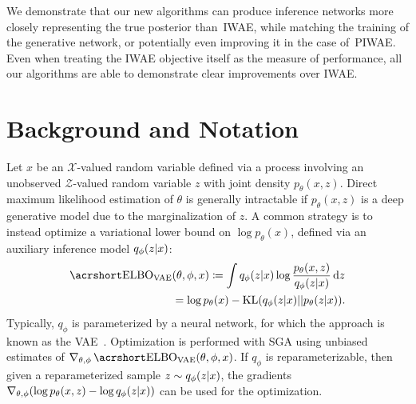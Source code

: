 We demonstrate that
our new algorithms can produce inference networks more closely representing the true posterior
than~\gls{IWAE}, while matching the
training of the generative network, or potentially even improving it in the case of~\gls{PIWAE}. 
Even when treating the \gls{IWAE} 
objective itself as the measure of performance, all our algorithms are able to demonstrate clear
improvements over \gls{IWAE}.

%

\section{Background and Notation}

Let $x$ be an $\mathcal{X}$-valued random variable defined via a process involving an unobserved $\mathcal{Z}$-valued random variable $z$ with joint density $p_{\theta}(x, z)$. Direct maximum likelihood estimation of $\theta$ is generally intractable if  $p_{\theta}(x, z)$ is a deep generative model due to the marginalization of $z$. A common strategy is to instead optimize a variational lower bound on $\log p_{\theta}(x)$, defined via an auxiliary inference model $q_{\phi}(z \lvert x)$:
\begin{align}
	\ELBO_{\text{VAE}} &(\theta, \phi, x) \coloneqq \int q_{\phi}(z \given x) \log \frac{p_{\theta}(x, z)} {q_{\phi}(z \given x)} \,\mathrm dz \nonumber \\
	&= \log p_{\theta}(x) - \mathrm{KL}(q_{\phi}(z \given x) || p_{\theta}(z \given x)). \label{eqn:intro/elbo_vae}
\end{align}
Typically, $q_{\phi}$ is parameterized by a neural network, for which the approach is known as the \gls{VAE}~\citep{Kingma2014auto,Rezende2014stochastic}. Optimization
is performed with \gls{SGA} using unbiased estimates of $\nabla_{\theta, \phi} \ELBO_{\text{VAE}}(\theta, \phi, x)$. If $q_{\phi}$ is reparameterizable, %
then given a reparameterized sample  $z \sim q_{\phi}(z  \lvert x)$, the gradients $\nabla_{\theta, \phi} (\log p_{\theta}(x, z) - \log q_{\phi}(z \lvert x))$ can be used for the 
optimization.

